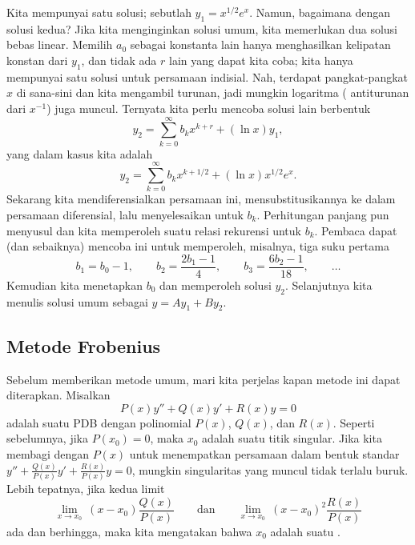 \begin{example}
Kita mempunyai satu solusi; sebutlah $y_1 = x^{1/2} e^x$.
Namun, bagaimana dengan solusi kedua? Jika
kita menginginkan solusi umum, kita memerlukan dua solusi bebas linear.
Memilih $a_0$ sebagai konstanta lain hanya menghasilkan kelipatan
konstan dari $y_1$, dan tidak ada $r$ lain yang dapat kita coba; kita hanya
mempunyai satu solusi untuk persamaan indisial. Nah, terdapat pangkat-pangkat $x$
di sana-sini dan kita mengambil turunan, jadi mungkin logaritma (
antiturunan dari $x^{-1}$) juga muncul. Ternyata kita perlu
mencoba solusi lain berbentuk
\begin{equation*}
y_2 = \sum_{k=0}^\infty b_k x^{k+r} + (\ln x) y_1 ,
\end{equation*}
yang dalam kasus kita adalah
\begin{equation*}
y_2 = \sum_{k=0}^\infty b_k x^{k+1/2} + (\ln x) x^{1/2} e^x .
\end{equation*}
Sekarang kita mendiferensialkan persamaan ini, mensubstitusikannya ke dalam persamaan
diferensial, lalu menyelesaikan untuk $b_k$. Perhitungan panjang pun menyusul dan kita
memperoleh suatu relasi rekurensi untuk $b_k$. Pembaca
dapat (dan sebaiknya) mencoba ini untuk memperoleh, misalnya, tiga suku pertama
\begin{equation*}
b_1 = b_0 -1 , \qquad b_2 = \frac{2b_1-1}{4} , \qquad b_3 =
\frac{6b_2-1}{18} , \qquad \ldots
\end{equation*}
Kemudian kita menetapkan $b_0$ dan memperoleh solusi $y_2$. Selanjutnya
kita menulis solusi umum sebagai $y = A y_1 + B y_2$.
\end{example}

\subsection{Metode Frobenius}

Sebelum memberikan metode umum, mari kita perjelas kapan metode ini dapat diterapkan.
Misalkan
\begin{equation*}
P(x) y'' + Q(x) y' + R(x) y = 0
\end{equation*}
adalah suatu PDB dengan polinomial
$P(x)$, $Q(x)$, dan $R(x)$.
Seperti sebelumnya, jika $P(x_0) = 0$, maka $x_0$ adalah suatu
titik singular.
Jika kita membagi dengan $P(x)$ untuk menempatkan persamaan dalam bentuk standar
$y'' + \frac{Q(x)}{P(x)} y' + \frac{R(x)}{P(x)} y = 0$,
mungkin singularitas yang muncul tidak terlalu buruk.
Lebih tepatnya, jika kedua limit
\begin{equation*}
\lim_{x \to x_0} ~ (x-x_0) \frac{Q(x)}{P(x)}
\qquad \text{dan} \qquad
\lim_{x \to x_0} ~ (x-x_0)^2 \frac{R(x)}{P(x)}
\end{equation*}
ada dan berhingga,
maka kita mengatakan bahwa $x_0$ adalah
suatu \emph{}.

